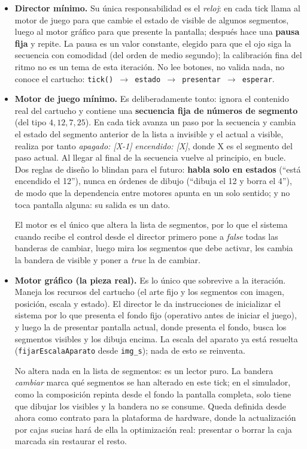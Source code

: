 \begin{itemize}
	\item \textbf{Director mínimo.} Su única responsabilidad es el \emph{reloj}: en cada tick llama al motor de juego para que cambie el estado de visible de algunos segmentos, luego al motor gráfico para que presente la pantalla; después hace una \textbf{pausa fija} y repite. La pausa es un valor constante, elegido para que el ojo siga la secuencia con comodidad (del orden de medio segundo); la calibración fina del ritmo no es un tema de esta iteración. No lee botones, no valida nada, no conoce el cartucho: \texttt{tick() $\rightarrow$ estado $\rightarrow$ presentar $\rightarrow$ esperar}.
	
	\item \textbf{Motor de juego mínimo.} Es deliberadamente tonto: ignora el contenido real del cartucho y contiene una \textbf{secuencia fija de números de segmento} (del tipo $4, 12, 7, 25$). En cada tick avanza un paso por la secuencia y cambia el estado del segmento anterior de la lista a invisible y el actual a visible, realiza por tanto \emph{apagado: [X-1]} \emph{encendido: [X]}, donde X es el segmento del paso actual. Al llegar al final de la secuencia vuelve al principio, en bucle. Dos reglas de diseño lo blindan para el futuro: \textbf{habla solo en estados} (``está encendido el 12''), nunca en órdenes de dibujo (``dibuja el 12 y borra el 4''), de modo que la dependencia entre motores apunta en un solo sentido; y no toca pantalla alguna: su salida es un dato. 
	
	El motor es el único que altera la lista de segmentos, por lo que el sistema cuando recibe el control desde el director primero pone a \emph{false} todas las banderas de cambiar, luego mira los segmentos que debe activar, les cambia la bandera de visible y poner a \emph{true} la de cambiar.
	
	\item \textbf{Motor gráfico (la pieza real).} Es lo único que sobrevive a la iteración. Maneja los recursos del cartucho (el arte fijo y los segmentos con imagen, posición, escala y estado). El director le da instrucciones de inicializar el sistema por lo que presenta el fondo fijo (operativo antes de iniciar el juego), y luego la de presentar pantalla actual, donde presenta el fondo, busca los segmentos visibles y los dibuja encima. La escala del aparato ya está resuelta (\texttt{fijarEscalaAparato} desde \texttt{img\_s}); nada de esto se reinventa. 
	
	No altera nada en la lista de segmentos: es un lector puro. La bandera \emph{cambiar} marca qué segmentos se han alterado en este tick; en el simulador, como la composición repinta desde el fondo la pantalla completa, solo tiene que dibujar los visibles y la bandera no se consume. Queda definida desde ahora como contrato para la plataforma de hardware, donde la actualización por cajas sucias hará de ella la optimización real: presentar o borrar la caja marcada sin restaurar el resto.
\end{itemize}

